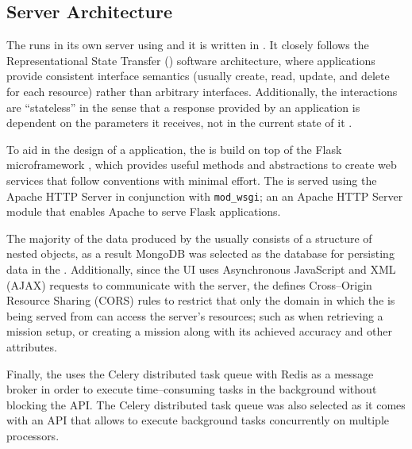 \subsection{Server Architecture} \label{subsect:case-study:arch:server}

The \mlblinkapi runs in its own server using \ubuntu and it is written in \python. It closely follows the Representational State Transfer (\rest) software architecture, where applications provide consistent interface semantics (usually create, read, update, and delete for each resource) rather than arbitrary interfaces. Additionally, the \rest interactions are ``stateless'' in the sense that a response provided by an application is dependent on the parameters it receives, not in the current state of it \cite{web:w3:rest}.

To aid in the design of a \rest application, the \mlblinkapi is build on top of the Flask microframework \cite{software:flask}, which provides useful methods and abstractions to create web services that follow \rest conventions with minimal effort. The \mlblinkapi is served using the Apache HTTP Server in conjunction with \texttt{mod\_wsgi}; an an Apache HTTP Server module that enables Apache to serve Flask applications.

The majority of the data produced by the \mlblinkui usually consists of a structure of nested objects, as a result MongoDB was selected as the database for persisting data in the \mlblinkapi. Additionally, since the UI uses Asynchronous JavaScript and XML (AJAX) requests to communicate with the server, the \mlblinkapi defines Cross--Origin Resource Sharing (CORS) rules to restrict that only the domain in which the \mlblinkui is being served from can access the server's resources; such as when retrieving a mission setup, or creating a mission along with its achieved accuracy and other attributes.

Finally, the \mlblinkapi uses the Celery distributed task queue \cite{software:celery} with Redis as a message broker in order to execute time--consuming tasks in the background without blocking the API. The Celery distributed task queue was also selected as it comes with an API that allows to execute background tasks concurrently on multiple processors.